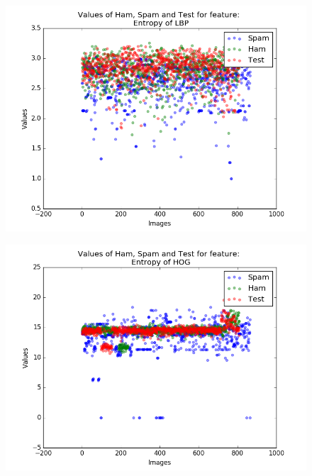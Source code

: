 \begin{figure}[h]
	\centering
	\begin{minipage}{.5\textwidth}
		\centering
		\includegraphics[width=\linewidth]{images/appA/EntropyofLBP_values_scatter}
		\label{fig:EntropyofLBP_values_scatter}
	\end{minipage}%
	\begin{minipage}{.5\textwidth}
		\centering
		\includegraphics[width=\linewidth]{images/appA/EntropyofHOG_values_scatter}
		\label{fig:EntropyofHOG_values_scatter}
	\end{minipage}
\end{figure}



